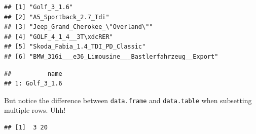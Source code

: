 \documentclass[]{book}
\newenvironment{Shaded}{\begin{snugshade}}{\end{snugshade}}
\newcommand{\CommentTok}[1]{\textcolor[rgb]{0.56,0.35,0.01}{\textit{#1}}}
\newcommand{\DecValTok}[1]{\textcolor[rgb]{0.00,0.00,0.81}{#1}}
\newcommand{\KeywordTok}[1]{\textcolor[rgb]{0.13,0.29,0.53}{\textbf{#1}}}
\newcommand{\NormalTok}[1]{#1}
\newcommand{\OperatorTok}[1]{\textcolor[rgb]{0.81,0.36,0.00}{\textbf{#1}}}
\newcommand{\StringTok}[1]{\textcolor[rgb]{0.31,0.60,0.02}{#1}}
\theoremstyle{definition}
\theoremstyle{definition}
\theoremstyle{definition}
\theoremstyle{remark}
\begin{document}
\begin{Shaded}
\end{Shaded}

\begin{verbatim}
## [1] "Golf_3_1.6"                                        
## [2] "A5_Sportback_2.7_Tdi"                              
## [3] "Jeep_Grand_Cherokee_\"Overland\""                  
## [4] "GOLF_4_1_4__3T\xdcRER"                             
## [5] "Skoda_Fabia_1.4_TDI_PD_Classic"                    
## [6] "BMW_316i___e36_Limousine___Bastlerfahrzeug__Export"
\end{verbatim}

\begin{Shaded}
\end{Shaded}

\begin{verbatim}
##          name
## 1: Golf_3_1.6
\end{verbatim}

But notice the difference between \texttt{data.frame} and \texttt{data.table} when subsetting multiple rows. Uhh!

\begin{Shaded}
\end{Shaded}

\begin{verbatim}
## [1]  3 20
\end{verbatim}

\begin{Shaded}
\end{Shaded}
\end{document}
